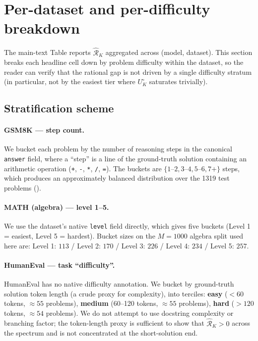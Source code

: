 \section{Per-dataset and per-difficulty breakdown}
\label{app:per-dataset}

The main-text Table reports $\hat{\mathcal R}_K$ aggregated across (model, dataset).
This section breaks each headline cell down by problem difficulty
within the dataset, so the reader can verify that the rational gap is
not driven by a single difficulty stratum (in particular, not by the
easiest tier where $U^\circ_K$ saturates trivially).

\subsection{Stratification scheme}

\paragraph{GSM8K — step count.}
We bucket each problem by the number of reasoning steps in the
canonical \texttt{answer} field, where a ``step'' is a line of the
ground-truth solution containing an arithmetic operation
(\texttt{+}, \texttt{-}, \texttt{*}, \texttt{/}, \texttt{=}). The
buckets are $\{1\text{--}2, 3\text{--}4, 5\text{--}6, 7+\}$ steps,
which produces an approximately balanced distribution over the 1319
test problems ().

\paragraph{MATH (algebra) — level 1--5.}
We use the dataset's native \texttt{level} field directly, which gives
five buckets (Level 1 = easiest, Level 5 = hardest). Bucket sizes on
the $M{=}1000$ algebra split used here are:
Level 1: $113$ / Level 2: $170$ / Level 3: $226$ / Level 4: $234$ /
Level 5: $257$.

\paragraph{HumanEval — task ``difficulty''.}
HumanEval has no native difficulty annotation. We bucket by ground-truth
solution token length (a crude proxy for complexity), into terciles:
\textbf{easy} ($<60$ tokens, $\approx 55$ problems), \textbf{medium}
(60--120 tokens, $\approx 55$ problems), \textbf{hard} ($>120$ tokens,
$\approx 54$ problems). We do not attempt to use docstring complexity
or branching factor; the token-length proxy is sufficient to show that
$\hat{\mathcal R}_K > 0$ across the spectrum and is not concentrated at the
short-solution end.

